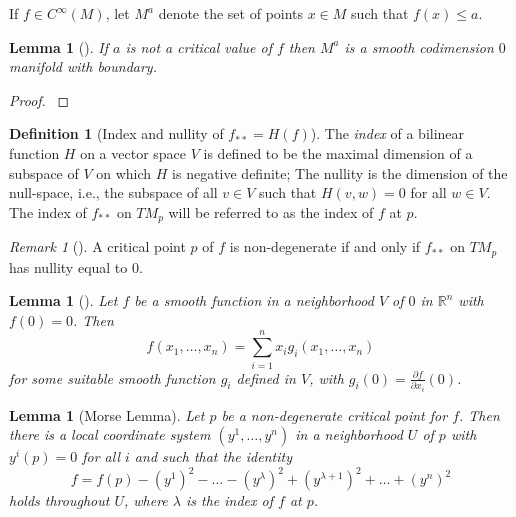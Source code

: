 \documentclass[reqno]{amsart}
\newtheorem{lemma}[theorem]{Lemma}
\theoremstyle{definition}
\newtheorem{definition}[theorem]{Definition}
\theoremstyle{remark}
\newtheorem*{remark}{Remark}
\begin{document}
    If $f \in C^{\infty}(M)$, let
    $M^{a}$ denote the set of points
    $x \in M$ such that $f(x) \le a$.

    \begin{lemma}[]
        If $a$ is not a critical value of $f$ then
        $M^{a}$ is a smooth codimension $0$ 
        manifold with boundary.
    \end{lemma}

    \begin{proof}
        \cite[Prop. 5.47]{LeeSM}
    \end{proof}

    \begin{definition}[Index and nullity of
        $f_{* *} = H(f)$]
        The \textit{index} of a bilinear function
        $H$ on a vector space $V$ is defined to
        be the maximal dimension of a subspace of
        $V$ on which $H$ is negative definite;
        The nullity is the dimension of the 
        null-space, i.e., the subspace of
        all $v \in V$ such that
        $H(v,w) = 0$ for all
        $w \in V$.\\
        The index of $f_{* *}$ on $TM_p$ will be referred
        to as the index of $f$ at $p$.
    \end{definition}

    \begin{remark}[]
        A critical point
        $p$ of $f$ is non-degenerate
        if and only if
        $f_{* *}$ on $TM_p$ has nullity equal to
        $0$.
    \end{remark}







    \begin{lemma}[]
        Let $f$ be a smooth function in a neighborhood
        $V$ of $0$ in $\mathbb{R}^{n}$ with
        $f(0) = 0$. Then
        \[
        f(x_1, \ldots, x_n) = 
        \sum_{i=1}^{n} x_i g_i\left( x_1, \ldots, x_n \right) 
        \] 
        for some suitable smooth function
        $g_i$ defined in $V$, with
        $g_i(0) = \frac{\partial f}{\partial x_i}(0)$.
    \end{lemma}

    \begin{lemma}[Morse Lemma]
        Let $p$ be a non-degenerate critical point
        for $f$. Then there is a local coordinate
        system $\left( y^{1}, \ldots, y^{n} \right) $ in
        a neighborhood $U$ of $p$ with
        $y^{i}(p) = 0$ for all $i$ and such that the identity
        \[
        f = f(p) - \left( y^{1} \right)^2 - \ldots
        - \left( y^{\lambda} \right)^2 + 
        \left( y^{\lambda+1} \right)^2 + \ldots
        + \left( y^{n} \right)^2
        \] 
        holds throughout $U$, where
        $\lambda$ is the index of $f$ at $p$.
    \end{lemma}
\end{document}
